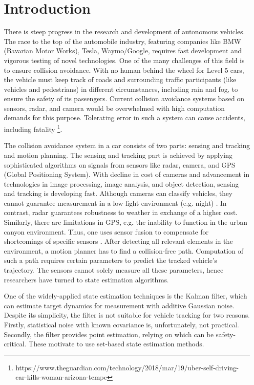 \chapter{Introduction} \label{ch:intro}
There is steep progress in the research and development of autonomous vehicles. The race to the top of the automobile industry, featuring companies like BMW (Bavarian Motor Works), Tesla, Waymo/Google, requires fast development and vigorous testing of novel technologies. One of the many challenges of this field is to ensure collision avoidance. With no human behind the wheel for Level 5 \cite{SAE2014} cars, the vehicle must keep track of roads and surrounding traffic participants (like vehicles and pedestrians) in different circumstances, including rain and fog, to ensure the safety of its passengers. Current collision avoidance systems based on sensors, radar, and camera would be overwhelmed with high computation demands for this purpose. Tolerating error in such a system can cause accidents, including fatality \footnote{https://www.theguardian.com/technology/2018/mar/19/uber-self-driving-car-kills-woman-arizona-tempe}.


The collision avoidance system in a car consists of two parts: sensing and tracking and motion planning. The sensing and tracking part is achieved by applying sophisticated algorithms on signals from sensors like radar, camera, and GPS (Global Positioning System). With decline in cost of cameras and advancement in technologies in image processing, image analysis, and object detection, sensing and tracking is developing fast. Although cameras can classify vehicles, they cannot guarantee measurement in a low-light environment (e.g. night) \cite{Hirz2018}. In contrast, radar guarantees robustness to weather in exchange of a higher cost. Similarly, there are limitations in GPS, e.g. the inability to function in the urban canyon environment. Thus, one uses sensor fusion to compensate for shortcomings of specific sensors . After detecting all relevant elements in the environment, a motion planner has to find a collision-free path. Computation of such a path requires certain parameters to predict the tracked vehicle's trajectory. The sensors cannot solely measure all these parameters, hence researchers have turned to state estimation algorithms.

One of the widely-applied state estimation techniques is the Kalman filter, which can estimate target dynamics for measurement with additive Gaussian noise. Despite its simplicity, the filter is not suitable for vehicle tracking for two reasons. Firstly, statistical noise with known covariance is, unfortunately, not practical. Secondly, the filter provides point estimation, relying on which can be safety-critical. These motivate to use set-based state estimation methods.

